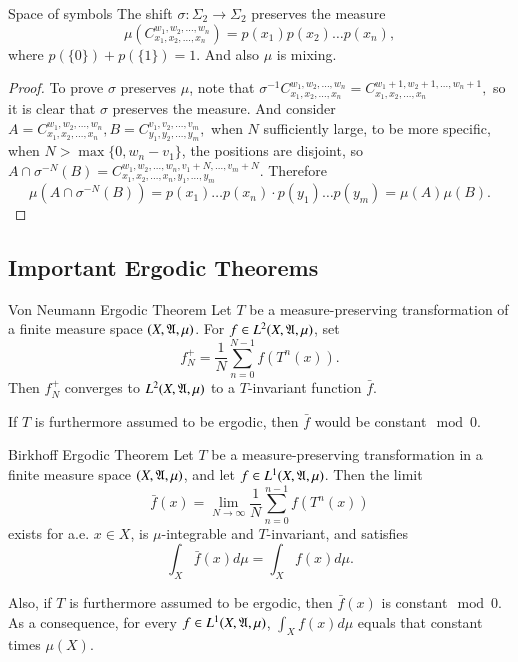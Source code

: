 \documentclass[12pt,a4paper]{article}
\begin{document}
	
	
	\begin{proposition}{Space of symbols}{}
		The shift $\sigma:\Sigma_2\rightarrow \Sigma_2$ preserves the measure 
		$$
		\mu(C_{x_1,x_2,\dots,x_n}^{w_1,w_2,\dots,w_n})=p(x_1)p(x_2)\dots p(x_n),
		$$
		where $p(\{0\})+p(\{1\})=1$. And also $\mu$ is mixing.
	\end{proposition}
	\begin{proof}
		To prove $\sigma$ preserves $\mu$, note that
		$
		\sigma^{-1}C_{x_1,x_2,\dots,x_n}^{w_1,w_2,\dots,w_n}=C_{x_1,x_2,\dots,x_n}^{w_1+1,w_2+1,\dots,w_n+1},
		$
		so it is clear that $\sigma$ preserves the measure. And consider
		$
		A=C_{x_1,x_2,\dots,x_n}^{w_1,w_2,\dots,w_n}, B=C_{y_1,y_2,\dots,y_m}^{v_1,v_2,\dots,v_m},
		$
		when $N$ sufficiently large, to be more specific, when $N>\max\{0,w_n-v_1\}$, the positions are disjoint, so $A\cap \sigma^{-N}(B)=C_{x_1,x_2,\dots,x_n,y_1,\dots,y_m}^{w_1,w_2,\dots,w_n,v_1+N,\dots,v_m+N}$. Therefore
		$$
		\mu(A\cap \sigma^{-N}(B))=p(x_1)\dots p(x_n)\cdot p(y_1)\dots p(y_m)=\mu(A)\mu(B).
		$$
	\end{proof}
	
	\subsection{Important Ergodic Theorems}
	\begin{theorem}{Von Neumann Ergodic Theorem}{}
		Let $T$ be a measure-preserving transformation of a finite measure space $(X,\mathfrak{A},\mu)$. For $f\in L^2(X,\mathfrak{A},\mu)$, set 
		$$
		f_N^+=\frac{1}{N}\sum_{n=0}^{N-1}f(T^n(x)).
		$$
		Then $f_N^+$ converges to $L^2(X,\mathfrak{A},\mu)$ to a $T$-invariant function $\bar{f}.$
	\end{theorem}
	If $T$ is furthermore assumed to be ergodic, then $\bar{f}$ would be constant$\mod 0$.
	\begin{theorem}{Birkhoff Ergodic Theorem}{}
		Let $T$ be a measure-preserving transformation in a finite measure space $(X,\mathfrak{A},\mu)$, and let $f\in L^1(X,\mathfrak{A},\mu)$. Then the limit
		$$
		\bar{f}(x)=\lim_{N\to\infty}\frac{1}{N}\sum_{n=0}^{n-1}f(T^n(x))
		$$
		exists for a.e. $x\in X$, is $\mu$-integrable and $T$-invariant, and satisfies
		$$
		\int_X \bar{f}(x)d\mu=\int_X f(x)d\mu.
		$$
	\end{theorem}
	Also, if $T$ is furthermore assumed to be ergodic, then $\bar{f}(x)$ is constant$\mod 0$. As a consequence, for every $f\in L^1(X,\mathfrak{A},\mu)$, $\int_X f(x)d\mu$ equals that constant times $\mu(X)$.
	
	
	
	
	
	
\end{document}
